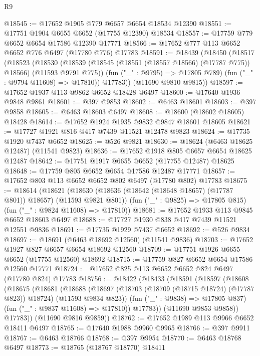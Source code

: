 \begin{lexlean}{R9}
\begin{coremodule}
@18545 := @17652 @1905 @779 @6657 @6654 @18534 @12390
@18551 := @17751 @1904 @6655 @6652 (@17755 @12390) @18534
@18557 := @17759 @779 @6652 @6654 @17586 @12390 @17771
@18566 := @17652 @777 @113 @6652 @6652 @776 @6497 (@17780 @776) @17783
@18591 := @18439
    (@18450
      (@18517
        (@18523
          (@18530
            (@18539 (@18545 (@18551 (@18557 @18566) (@17787 @775)) @18566) (@11593 @9791 @775))
            (fun ("_" : @9795) => @17805 @789)
            (fun ("_" : @9794 @11608) => @17810))
          @17783))
      (@11690 @9810 @9815))
@18597 := @17652 @1937 @113 @9862 @6652 @18428 @6497
@18600 := @17640 @1936 @9848 @9861
@18601 := @397 @9853
@18602 := @6463 @18601
@18603 := @397 @9858
@18605 := @6463 @18603 @6497
@18608 := @18600 (@18602 @18605) @18428
@18614 := @17652 @1924 @1935 @9832 @9847 @18601 @18605
@18621 := @17727 @1921 @816 @417 @7439 @11521 @12478 @9823
@18624 := @17735 @1920 @7437 @6652
@18625 := @526 @9821
@18630 := @18624 (@6463 @18625 @12487) (@11541 @9823)
@18636 := @17652 @1918 @805 @6657 @6654 @18625 @12487
@18642 := @17751 @1917 @6655 @6652 (@17755 @12487) @18625
@18648 := @17759 @805 @6652 @6654 @17586 @12487 @17771
@18657 := @17652 @803 @113 @6652 @6652 @802 @6497 (@17780 @802) @17783
@18675 := @18614
    (@18621
      (@18630 (@18636 (@18642 (@18648 @18657) (@17787 @801)) @18657) (@11593 @9821 @801))
      (fun ("_" : @9825) => @17805 @815)
      (fun ("_" : @9824 @11608) => @17810))
@18681 := @17652 @1933 @113 @9845 @6652 @18603 @6497
@18688 := @17727 @1930 @838 @417 @7439 @11521 @12551 @9836
@18691 := @17735 @1929 @7437 @6652
@18692 := @526 @9834
@18697 := @18691 (@6463 @18692 @12560) (@11541 @9836)
@18703 := @17652 @1927 @827 @6657 @6654 @18692 @12560
@18709 := @17751 @1926 @6655 @6652 (@17755 @12560) @18692
@18715 := @17759 @827 @6652 @6654 @17586 @12560 @17771
@18724 := @17652 @825 @113 @6652 @6652 @824 @6497 (@17780 @824) @17783
@18756 := @18422
    (@18433
      (@18591
        (@18597
          (@18608
            (@18675
              (@18681
                (@18688
                  (@18697
                    (@18703 (@18709 (@18715 @18724) (@17787 @823)) @18724)
                    (@11593 @9834 @823))
                  (fun ("_" : @9838) => @17805 @837)
                  (fun ("_" : @9837 @11608) => @17810))
                @17783))
            (@11690 @9853 @9858))
          @17783))
      (@11690 @9816 @9859))
@18762 := @17652 @1989 @113 @9966 @6652 @18411 @6497
@18765 := @17640 @1988 @9960 @9965
@18766 := @397 @9911
@18767 := @6463 @18766
@18768 := @397 @9954
@18770 := @6463 @18768 @6497
@18773 := @18765 (@18767 @18770) @18411

\end{coremodule}
\end{lexlean}
